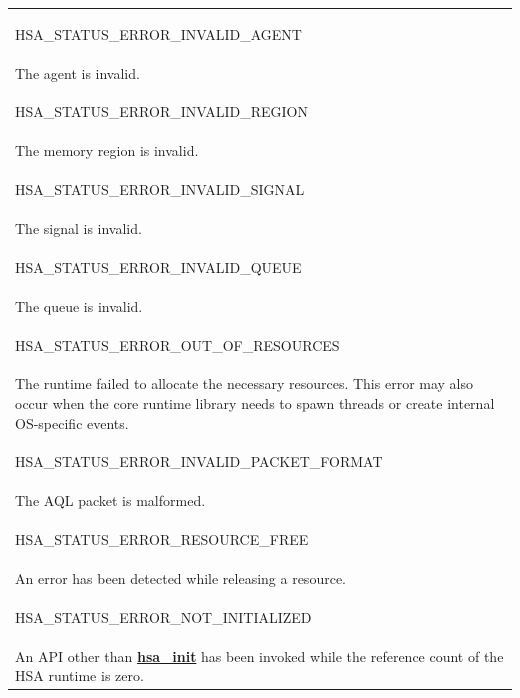 \documentclass[final]{book}
\newcommand{\reffun}[1]{\textbf{#1}}
\newcommand{\reftyp}[1]{#1}
\newcommand{\refenu}[1]{\reftyp{#1}}
\begin{document}
\begin{longtable}{@{\hspace{2em}}p{\linewidth-2em}}
\hspace{-2em}\hypertarget{group__status_1ggad755322e7ff95456520e8abdbe90d225a3a5d835c109c2d0ad5b9c2771e133e5d}{\refenu{HSA_\-STATUS_\-ERROR_\-INVALID_\-AGENT}} \\The agent is invalid.\\[2mm]
\hspace{-2em}\hypertarget{group__status_1ggad755322e7ff95456520e8abdbe90d225ad63594ac02edec7ae7aa7722c11afcd9}{\refenu{HSA_\-STATUS_\-ERROR_\-INVALID_\-REGION}} \\The memory region is invalid.\\[2mm]
\hspace{-2em}\hypertarget{group__status_1ggad755322e7ff95456520e8abdbe90d225a7b4c8c0d4c99a1fe966abc2d39b575fe}{\refenu{HSA_\-STATUS_\-ERROR_\-INVALID_\-SIGNAL}} \\The signal is invalid.\\[2mm]
\hspace{-2em}\hypertarget{group__status_1ggad755322e7ff95456520e8abdbe90d225aa3c762eb6a61b358702b45259d1686c4}{\refenu{HSA_\-STATUS_\-ERROR_\-INVALID_\-QUEUE}} \\The queue is invalid.\\[2mm]
\hspace{-2em}\hypertarget{group__status_1ggad755322e7ff95456520e8abdbe90d225a1a77fcf36d0d140874c4361ab093eff7}{\refenu{HSA_\-STATUS_\-ERROR_\-OUT_\-OF_\-RESOURCES}} \\The runtime failed to allocate the necessary resources. This error may also occur when the core runtime library needs to spawn threads or create internal OS-specific events.\\[2mm]
\hspace{-2em}\hypertarget{group__status_1ggad755322e7ff95456520e8abdbe90d225a3fad45f72111eb99de5d8daef26c372c}{\refenu{HSA_\-STATUS_\-ERROR_\-INVALID_\-PACKET_\-FORMAT}} \\The AQL packet is malformed.\\[2mm]
\hspace{-2em}\hypertarget{group__status_1ggad755322e7ff95456520e8abdbe90d225a6406af88203fcbec4179fbb71cc66b65}{\refenu{HSA_\-STATUS_\-ERROR_\-RESOURCE_\-FREE}} \\An error has been detected while releasing a resource.\\[2mm]
\hspace{-2em}\hypertarget{group__status_1ggad755322e7ff95456520e8abdbe90d225a34ea59ade5bfce95eee935238a99f5b5}{\refenu{HSA_\-STATUS_\-ERROR_\-NOT_\-INITIALIZED}} \\An API other than \hyperlink{group__initshutdown_1ga5b8574433e7dbcbd31ea397a02e3c32b}{\reffun{hsa_\-init}} has been invoked while the reference count of the HSA runtime is zero.\\[2mm]

\end{longtable}
\end{document}
